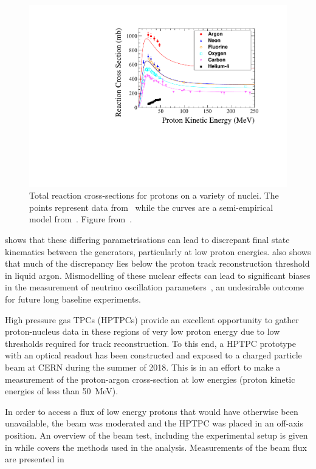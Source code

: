\begin{figure}[h]
  \centering
  \includegraphics[width=.8\linewidth]{files/figures/hptpc_beam_flux/DataProtonCrossSections}
  \caption[Proton-nucleus cross-section data compared with a semi-empirical model]{Total reaction cross-sections for protons on a variety of nuclei. The points represent data from~\cite{protonXSecData} while the curves are a semi-empirical model from~\cite{protonXSecModel}. Figure from~\cite{hptpcProposal}.}
  \label{fig:protonNucleus}
\end{figure}

 shows that these differing parametrisations can lead to discrepant final state kinematics between the generators, particularly at low proton energies.
 also shows that much of the discrepancy lies below the proton track reconstruction threshold in liquid argon.
Mismodelling of these nuclear effects can lead to significant biases in the measurement of neutrino oscillation parameters~\cite{nuclearMismodelOsc}, an undesirable outcome for future long baseline experiments.

High pressure gas TPCs (HPTPCs) provide an excellent opportunity to gather proton-nucleus data in these regions of very low proton energy due to low thresholds required for track reconstruction.
To this end, a HPTPC prototype with an optical readout has been constructed and exposed to a charged particle beam at CERN during the summer of 2018.
This is in an effort to make a measurement of the proton-argon cross-section at low energies (proton kinetic energies of less than \SI{50}{\mega\electronvolt}).

In order to access a flux of low energy protons that would have otherwise been unavailable, the beam was moderated and the HPTPC was placed in an off-axis position. 
An overview of the beam test, including the experimental setup is given in  while  covers the methods used in the analysis. 
Measurements of the beam flux are presented in 

